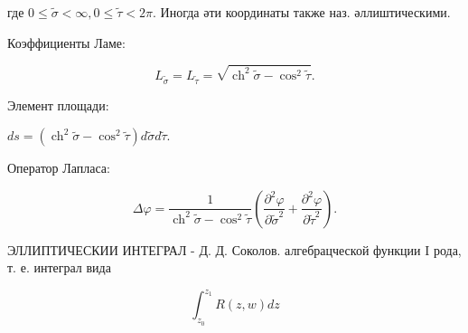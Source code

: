 \documentclass[10pt]{article}
\begin{document}
где $0 \leqslant \tilde{\sigma}<\infty, 0 \leqslant \tilde{\tau}<2 \pi$. Иногда әти координаты также наз. әллиштическими.



Коэффициенты Ламе:



\[

L_{\tilde{\sigma}}=L_{\tilde{\tau}}=\sqrt{\operatorname{ch}^{2} \tilde{\sigma}-\cos ^{2} \tilde{\tau}} .

\]



Элемент площади:



$d s=\left(\operatorname{ch}^{2} \tilde{\sigma}-\cos ^{2} \tilde{\tau}\right) d \tilde{\sigma} d \tilde{\tau}$.



Оператор Лапласа:



\[

\Delta \varphi=\frac{1}{\operatorname{ch}^{2} \tilde{\sigma}-\cos ^{2} \tilde{\tau}}\left(\frac{\partial^{2} \varphi}{\partial \tilde{\sigma}^{2}}+\frac{\partial^{2} \varphi}{\partial \tilde{\tau}^{2}}\right) .

\]



ЭЛЛИПТИЧЕСКИИ ИНТЕГРАЛ - Д. Д. Соколов. алгебрацческой функции I рода, т. е. интеграл вида



\[

\int_{z_{0}}^{z_{1}} R(z, w) d z

\]
\end{document}

